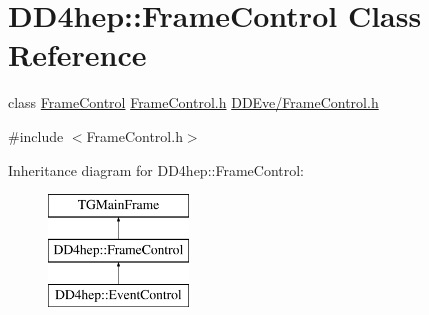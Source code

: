 \hypertarget{class_d_d4hep_1_1_frame_control}{}\section{D\+D4hep\+:\+:Frame\+Control Class Reference}
\label{class_d_d4hep_1_1_frame_control}


class \hyperlink{class_d_d4hep_1_1_frame_control}{Frame\+Control} \hyperlink{_frame_control_8h}{Frame\+Control.\+h} \hyperlink{_frame_control_8h}{D\+D\+Eve/\+Frame\+Control.\+h}  




{\ttfamily \#include $<$Frame\+Control.\+h$>$}

Inheritance diagram for D\+D4hep\+:\+:Frame\+Control\+:\begin{figure}[H]
\begin{center}
\leavevmode
\includegraphics[height=3.000000cm]{class_d_d4hep_1_1_frame_control}
\end{center}
\end{figure}
